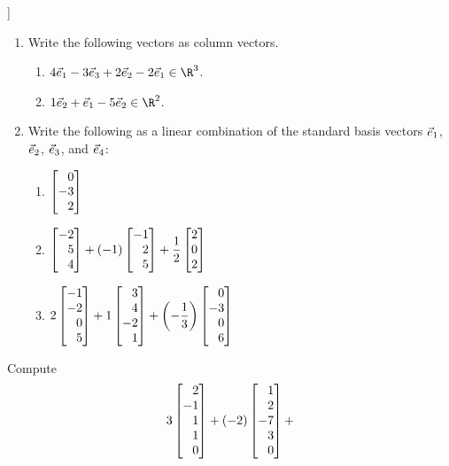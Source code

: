 \begin{exercises}
	\begin{problist}
		\prob[\beezer[VO.C10]] 
		\begin{enumerate}
			\item
				Write the following vectors as column vectors.
				\begin{enumerate}
					\item $4\sbasis{1} -3\sbasis{3} +2\sbasis{2} -2\sbasis{1}\in\R^3$.
					\item $1\sbasis{2} +\sbasis{1} -5\sbasis{2} \in\R^2$.
				\end{enumerate}
			\item
				Write the following as a linear combination of the standard basis
				vectors $\vec { e}_{1}$, $\vec { e}_{2}$, $\vec { e}_{3}$, and $\vec { e}_{4}$:
				\begin{enumerate}
					\item $\mat{0\\-3\\2}$
					\item $\displaystyle
						\mat{-2\\5\\4} + (-1)\mat{-1\\2\\ 5} + \frac12\mat{2\\0\\2}$
					\item $\displaystyle
						2\mat{-1\\-2\\0\\ 5}
						+1\mat{3\\4\\-2\\ 1}
						+\left(-\frac13\right)\mat{0\\-3\\0\\ 6}$
				\end{enumerate}
		\end{enumerate}
		\prob
		Compute
		\[
			3\mat{2\\-1\\1\\1\\0}+
			(-2)\mat{1\\2\\-7\\3\\0}+
\]
\end{problist}
\end{exercises}
